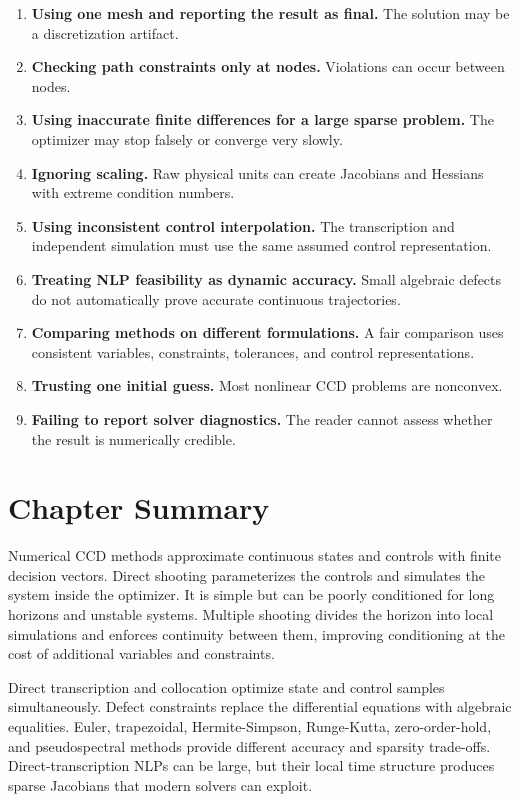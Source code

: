 \documentclass[11pt]{article}
\begin{document}
\begin{enumerate}[leftmargin=1.5em]
  \item \textbf{Using one mesh and reporting the result as final.} The solution may be a discretization artifact.
  \item \textbf{Checking path constraints only at nodes.} Violations can occur between nodes.
  \item \textbf{Using inaccurate finite differences for a large sparse problem.} The optimizer may stop falsely or converge very slowly.
  \item \textbf{Ignoring scaling.} Raw physical units can create Jacobians and Hessians with extreme condition numbers.
  \item \textbf{Using inconsistent control interpolation.} The transcription and independent simulation must use the same assumed control representation.
  \item \textbf{Treating NLP feasibility as dynamic accuracy.} Small algebraic defects do not automatically prove accurate continuous trajectories.
  \item \textbf{Comparing methods on different formulations.} A fair comparison uses consistent variables, constraints, tolerances, and control representations.
  \item \textbf{Trusting one initial guess.} Most nonlinear CCD problems are nonconvex.
  \item \textbf{Failing to report solver diagnostics.} The reader cannot assess whether the result is numerically credible.
\end{enumerate}

\section{Chapter Summary}

Numerical CCD methods approximate continuous states and controls with finite decision vectors. Direct shooting parameterizes the controls and simulates the system inside the optimizer. It is simple but can be poorly conditioned for long horizons and unstable systems. Multiple shooting divides the horizon into local simulations and enforces continuity between them, improving conditioning at the cost of additional variables and constraints.

Direct transcription and collocation optimize state and control samples simultaneously. Defect constraints replace the differential equations with algebraic equalities. Euler, trapezoidal, Hermite-Simpson, Runge-Kutta, zero-order-hold, and pseudospectral methods provide different accuracy and sparsity trade-offs. Direct-transcription NLPs can be large, but their local time structure produces sparse Jacobians that modern solvers can exploit.
\end{document}
